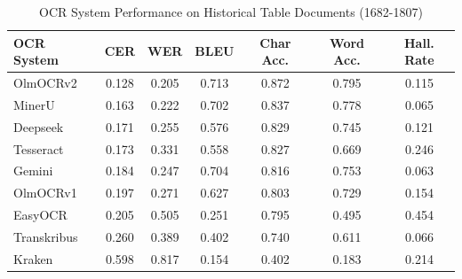\begin{table}[htbp]
\centering
\caption{OCR System Performance on Historical Table Documents (1682-1807)}
\label{tab:table-ocr-performance}
\begin{tabular}{lcccccc}
\toprule
OCR System & CER & WER & BLEU & Char Acc. & Word Acc. & Hall. Rate \\
\midrule
OlmOCRv2        & 0.128 & 0.205 & 0.713 & 0.872 & 0.795 & 0.115 \\
MinerU          & 0.163 & 0.222 & 0.702 & 0.837 & 0.778 & 0.065 \\
Deepseek        & 0.171 & 0.255 & 0.576 & 0.829 & 0.745 & 0.121 \\
Tesseract       & 0.173 & 0.331 & 0.558 & 0.827 & 0.669 & 0.246 \\
Gemini          & 0.184 & 0.247 & 0.704 & 0.816 & 0.753 & 0.063 \\
OlmOCRv1        & 0.197 & 0.271 & 0.627 & 0.803 & 0.729 & 0.154 \\
EasyOCR         & 0.205 & 0.505 & 0.251 & 0.795 & 0.495 & 0.454 \\
Transkribus     & 0.260 & 0.389 & 0.402 & 0.740 & 0.611 & 0.066 \\
Kraken          & 0.598 & 0.817 & 0.154 & 0.402 & 0.183 & 0.214 \\
\bottomrule
\end{tabular}
\end{table}